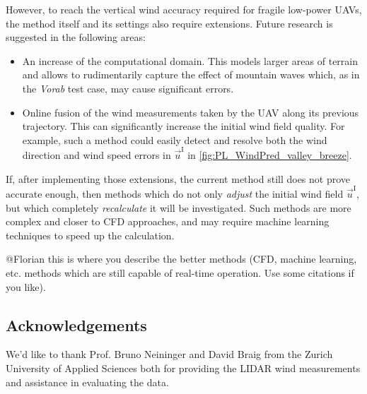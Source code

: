 \documentclass[twocolumn,letterpaper]{IEEEAerospaceCLS}
\newcommand{\note}[1]{\par {\color{OliveGreen} #1 \par}} %
\begin{document}
However, to reach the vertical wind accuracy required for fragile low-power UAVs, the method itself and its settings also require extensions. Future research is suggested in the following areas: 
\begin{itemize}
\item An increase of the computational domain. This models larger areas of terrain and allows to rudimentarily capture the effect of mountain waves which, as in the \emph{Vorab} test case, may cause significant errors.
\item Online fusion of the wind measurements taken by the UAV along its previous trajectory. This can significantly increase the initial wind field quality. For example, such a method could easily detect and resolve both the wind direction and wind speed errors in $\vec{u}^\text{I}$ in \cref{fig:PL_WindPred_valley_breeze}.
\end{itemize}

If, after implementing those extensions, the current method still does not prove accurate enough, then methods which do not only \emph{adjust} the initial wind field $\vec{u}^\text{I}$, but which completely \emph{recalculate} it will be investigated. Such methods are more complex and closer to \ac{CFD} approaches, and may require machine learning techniques to speed up the calculation.
\note{@Florian this is where you describe the better methods (CFD, machine learning, etc. methods which are still capable of real-time operation. Use some citations if you like).}


\subsection*{Acknowledgements}
We'd like to thank Prof. Bruno Neininger and  David Braig from the Zurich University of Applied Sciences both for providing the LIDAR wind measurements and assistance in evaluating the data.




\end{document}
